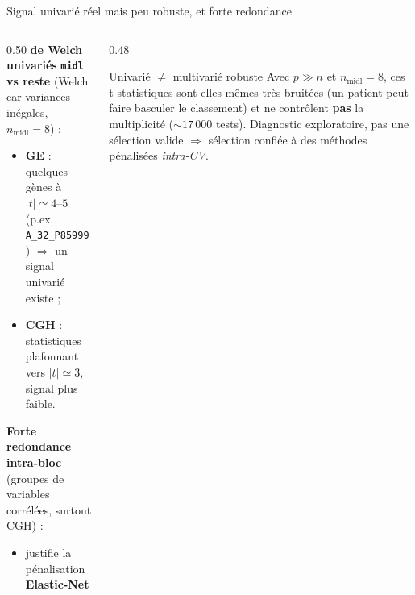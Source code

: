 \documentclass[aspectratio=169, 10pt]{beamer}
\begin{document}
\begin{frame}{Signal univarié réel mais peu robuste, et forte redondance}
  \begin{columns}[T]
    \begin{column}{0.50\textwidth}
       \textbf{de Welch univariés} \texttt{\textbf{midl}} \textbf{vs reste} (Welch car variances inégales, $n_{\text{midl}} = 8$) :
      \begin{itemize}
        \item \textbf{GE} : quelques gènes à $|t| \simeq 4$–$5$ (p.ex. \texttt{A\_32\_P85999}) $\Rightarrow$ un signal univarié existe ;
        \item \textbf{CGH} : statistiques plafonnant vers $|t| \simeq 3$, signal plus faible.
      \end{itemize}
      \bigskip
      \textbf{Forte redondance intra-bloc} (groupes de variables corrélées, surtout CGH) :
      \begin{itemize}
        \item justifie la pénalisation \textbf{Elastic-Net}
      \end{itemize}
    \end{column}

    \begin{column}{0.48\textwidth}
      \begin{exampleblock}{Univarié $\neq$ multivarié robuste}
        Avec $p \gg n$ et $n_{\text{midl}} = 8$, ces t-statistiques sont elles-mêmes très bruitées (un patient peut faire basculer le classement) et ne contrôlent \textbf{pas} la multiplicité ($\sim 17\,000$ tests). Diagnostic exploratoire, pas une sélection valide $\Rightarrow$ sélection confiée à des méthodes pénalisées \textit{intra-CV}.
      \end{exampleblock}
    \end{column}
  \end{columns}
\end{frame}
\end{document}
